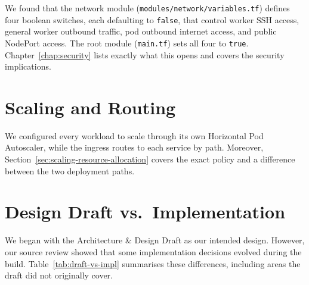 \begin{infobox}[Note]
We found that the network module (\texttt{modules/\allowbreak network/\allowbreak variables.tf}) defines four boolean
switches, each defaulting to \texttt{false}, that control worker SSH access,
general worker outbound traffic, pod outbound internet access, and public
NodePort access. The root module (\texttt{main.tf}) sets all four to
\texttt{true}. Chapter~\ref{chap:security} lists exactly what this opens and
covers the security implications.
\end{infobox}

\section{Scaling and Routing}\label{sec:app-layer-design}
We configured every workload to scale through its own Horizontal Pod Autoscaler,
while the ingress routes to each service by path. Moreover,
Section~\ref{sec:scaling-resource-allocation} covers
the exact policy and a difference between the two deployment paths.

\section{Design Draft vs.\ Implementation}\label{sec:draft-vs-implementation}
We began with the Architecture \& Design Draft as our intended design. However,
our source review showed that some implementation decisions evolved during the
build. Table~\ref{tab:draft-vs-impl} summarises these differences, including areas
the draft did not originally cover.


